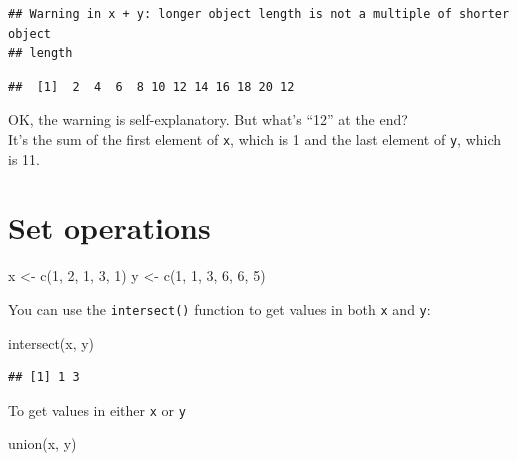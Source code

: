 \documentclass[
]{book}
\newenvironment{Shaded}{\begin{snugshade}}{\end{snugshade}}
\newcommand{\DecValTok}[1]{\textcolor[rgb]{0.00,0.00,0.81}{#1}}
\newcommand{\FunctionTok}[1]{\textcolor[rgb]{0.00,0.00,0.00}{#1}}
\newcommand{\NormalTok}[1]{#1}
\newcommand{\OtherTok}[1]{\textcolor[rgb]{0.56,0.35,0.01}{#1}}
\theoremstyle{definition}
\theoremstyle{definition}
\theoremstyle{definition}
\theoremstyle{definition}
\theoremstyle{remark}
\begin{document}
\begin{verbatim}
## Warning in x + y: longer object length is not a multiple of shorter object
## length
\end{verbatim}

\begin{verbatim}
##  [1]  2  4  6  8 10 12 14 16 18 20 12
\end{verbatim}

OK, the warning is self-explanatory. But what's ``12'' at the end?\\
It's the sum of the first element of \texttt{x}, which is 1 and the last element of \texttt{y}, which is 11.

\hypertarget{set-operations}{%
\section{Set operations}\label{set-operations}}

\begin{Shaded}
\begin{Highlighting}[]
\NormalTok{x }\OtherTok{\textless{}{-}} \FunctionTok{c}\NormalTok{(}\DecValTok{1}\NormalTok{, }\DecValTok{2}\NormalTok{, }\DecValTok{1}\NormalTok{, }\DecValTok{3}\NormalTok{, }\DecValTok{1}\NormalTok{)}
\NormalTok{y }\OtherTok{\textless{}{-}} \FunctionTok{c}\NormalTok{(}\DecValTok{1}\NormalTok{, }\DecValTok{1}\NormalTok{, }\DecValTok{3}\NormalTok{, }\DecValTok{6}\NormalTok{, }\DecValTok{6}\NormalTok{, }\DecValTok{5}\NormalTok{)}
\end{Highlighting}
\end{Shaded}

You can use the \texttt{intersect()} function to get values in both \texttt{x} and \texttt{y}:

\begin{Shaded}
\begin{Highlighting}[]
\FunctionTok{intersect}\NormalTok{(x, y)}
\end{Highlighting}
\end{Shaded}

\begin{verbatim}
## [1] 1 3
\end{verbatim}

To get values in either \texttt{x} or \texttt{y}

\begin{Shaded}
\begin{Highlighting}[]
\FunctionTok{union}\NormalTok{(x, y)}
\end{Highlighting}
\end{Shaded}
\end{document}
